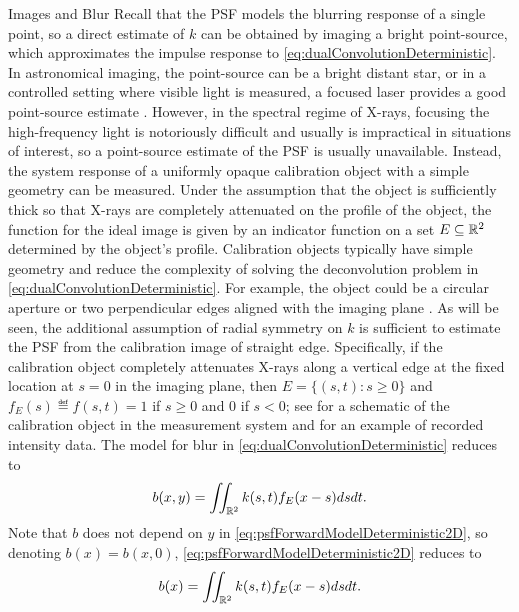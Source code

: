 \begin{chapter}{Images and Blur}
  Recall that the PSF models the blurring response of a single point, so a direct estimate of $k$ can be obtained by imaging a bright point-source, which approximates the impulse response to \eqref{eq:dualConvolutionDeterministic}.
  In astronomical imaging, the point-source can be a bright distant star, or in a controlled setting where visible light is measured, a focused laser provides a good point-source estimate \citep{tomaney1996expanding}.
  However, in the spectral regime of X-rays, focusing the high-frequency light is notoriously difficult and usually is impractical in situations of interest, so a point-source estimate of the PSF is usually unavailable. %
  Instead, the system response of a uniformly opaque calibration object with a simple geometry can be measured.
  Under the assumption that the object is sufficiently thick so that X-rays are completely attenuated on the profile of the object, the function for the ideal image is given by an indicator function on a set $E \subseteq \mathbb R^2$ determined by the object's profile.
  Calibration objects typically have simple geometry and reduce the complexity of solving the deconvolution problem in \eqref{eq:dualConvolutionDeterministic}.  
  For example, the object could be a circular aperture or two perpendicular edges aligned with the imaging plane \citep{doering1992,watson1993}.
  As will be seen, the additional assumption of radial symmetry on $k$ is sufficient to estimate the PSF from the calibration image of straight edge. 
  Specifically, if the calibration object completely attenuates X-rays along a vertical edge at the fixed location at $s=0$ in the imaging plane, then $E=\{(s,t):s\ge0\}$ and $f_E(s) \eqdef f(s,t) = 1$ if $s\ge0$ and $0$ if $s <0$; see  for a schematic of the calibration object in the measurement system and  for an example of recorded intensity data.
  The model for blur in \eqref{eq:dualConvolutionDeterministic} reduces to
\begin{equation}\label{eq:psfForwardModelDeterministic2D}
  b(x,y) = \iint_{\mathbb R^2} k(s,t) f_E(x-s)dsdt. 
\end{equation}
  Note that $b$ does not depend on $y$ in \eqref{eq:psfForwardModelDeterministic2D}, so denoting $b(x) = b(x,0)$, \eqref{eq:psfForwardModelDeterministic2D} reduces to
\begin{equation}\label{eq:psfForwardModelDeterministic}
  b(x) = \iint_{\mathbb R^2} k(s,t) f_E(x-s)dsdt. 
\end{equation} 
  

\end{chapter}
